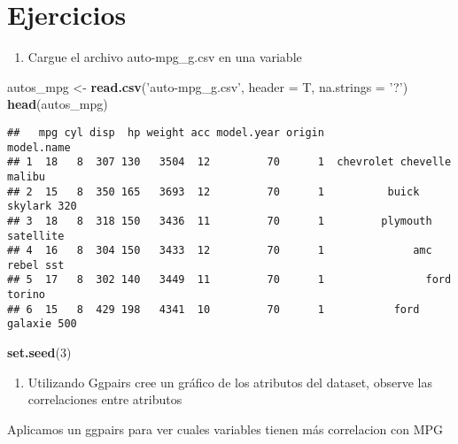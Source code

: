 \documentclass[]{article}
\newenvironment{Shaded}{\begin{snugshade}}{\end{snugshade}}
\newcommand{\DataTypeTok}[1]{\textcolor[rgb]{0.13,0.29,0.53}{#1}}
\newcommand{\DecValTok}[1]{\textcolor[rgb]{0.00,0.00,0.81}{#1}}
\newcommand{\KeywordTok}[1]{\textcolor[rgb]{0.13,0.29,0.53}{\textbf{#1}}}
\newcommand{\NormalTok}[1]{#1}
\newcommand{\StringTok}[1]{\textcolor[rgb]{0.31,0.60,0.02}{#1}}
\providecommand{\tightlist}{%
  \setlength{\itemsep}{0pt}\setlength{\parskip}{0pt}}
\begin{document}
\hypertarget{ejercicios}{%
\section{Ejercicios}\label{ejercicios}}

\begin{enumerate}
\def\labelenumi{\arabic{enumi}.}
\tightlist
\item
  Cargue el archivo auto-mpg\_g.csv en una variable
\end{enumerate}

\begin{Shaded}
\begin{Highlighting}[]
\NormalTok{autos_mpg <-}\StringTok{ }\KeywordTok{read.csv}\NormalTok{(}\StringTok{'auto-mpg_g.csv'}\NormalTok{, }\DataTypeTok{header =}\NormalTok{ T, }\DataTypeTok{na.strings =} \StringTok{'?'}\NormalTok{)}
\KeywordTok{head}\NormalTok{(autos_mpg)}
\end{Highlighting}
\end{Shaded}

\begin{verbatim}
##   mpg cyl disp  hp weight acc model.year origin                 model.name
## 1  18   8  307 130   3504  12         70      1  chevrolet chevelle malibu
## 2  15   8  350 165   3693  12         70      1          buick skylark 320
## 3  18   8  318 150   3436  11         70      1         plymouth satellite
## 4  16   8  304 150   3433  12         70      1              amc rebel sst
## 5  17   8  302 140   3449  11         70      1                ford torino
## 6  15   8  429 198   4341  10         70      1           ford galaxie 500
\end{verbatim}

\begin{Shaded}
\begin{Highlighting}[]
\KeywordTok{set.seed}\NormalTok{(}\DecValTok{3}\NormalTok{)}
\end{Highlighting}
\end{Shaded}

\begin{enumerate}
\def\labelenumi{\arabic{enumi}.}
\setcounter{enumi}{1}
\tightlist
\item
  Utilizando Ggpairs cree un gráfico de los atributos del dataset,
  observe las correlaciones entre atributos
\end{enumerate}

Aplicamos un ggpairs para ver cuales variables tienen más correlacion
con MPG
\end{document}
